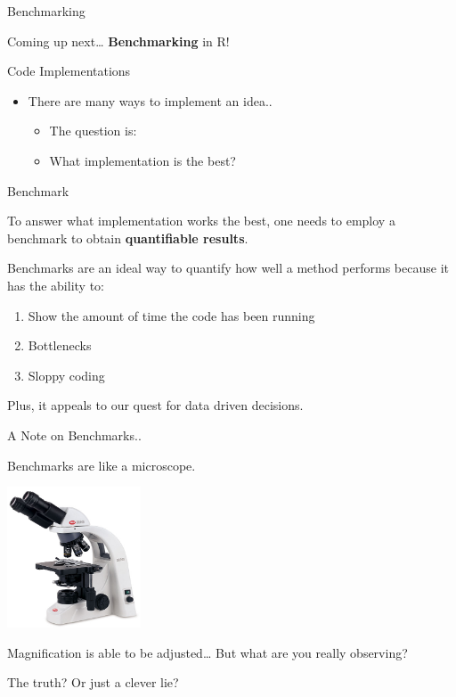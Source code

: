 \begin{frame}{Benchmarking}

Coming up next\ldots{} \textbf{Benchmarking} in R!

\end{frame}

\begin{frame}{Code Implementations}

\begin{itemize}
\tightlist
\item
  There are many ways to implement an idea..

  \begin{itemize}
  \tightlist
  \item
    The question is:
  \item
    What implementation is the best?
  \end{itemize}
\end{itemize}

\end{frame}

\begin{frame}{Benchmark}

To answer what implementation works the best, one needs to employ a
benchmark to obtain \textbf{quantifiable results}.

Benchmarks are an ideal way to quantify how well a method performs
because it has the ability to:

\begin{enumerate}
\def\labelenumi{\arabic{enumi}.}
\tightlist
\item
  Show the amount of time the code has been running
\item
  Bottlenecks
\item
  Sloppy coding
\end{enumerate}

Plus, it appeals to our quest for data driven decisions.

\end{frame}

\begin{frame}{A Note on Benchmarks..}

Benchmarks are like a microscope.

\begin{center}\includegraphics[width=150px]{figures/microscope} \end{center}

Magnification is able to be adjusted\ldots{} But what are you really
observing?

The truth? Or just a clever lie?

\end{frame}

